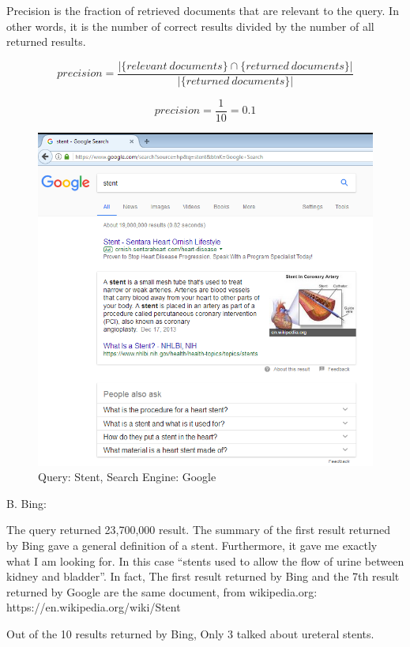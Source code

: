 \documentclass[a4paper, 11pt]{article}
\begin{document}
Precision is the fraction of retrieved documents that are relevant to the query. In other words, it is the number of correct results divided by the number of all returned results.

$$ 
precision = \frac{|\{relevant\ documents\} \cap \{returned\ documents\}|}{|\{returned\ documents\}|}
$$

$$ 
precision = \frac{1}{10} = 0.1
$$

\pagebreak

\begin{figure}[h]
\caption{Query: Stent, Search Engine: Google}
\centering
\includegraphics[scale=0.7]{Q1/stent_Google.png}
\end{figure}



\pagebreak

B. Bing:

The query returned 23,700,000 result. The summary of the first result returned by Bing gave a general definition of a stent. Furthermore, it gave me exactly what I am looking for. In this case ``stents used to allow the flow of urine between kidney and bladder''. In fact, The first result returned by Bing and the 7th result returned by Google are the same document, from wikipedia.org:
https://en.wikipedia.org/wiki/Stent 

Out of the 10 results returned by Bing, Only 3 talked about ureteral stents.
\end{document}
